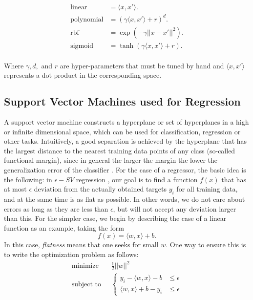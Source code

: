\begin{align}
\text{linear} &= \langle x, x' \rangle. \\
\text{polynomial} &= (\gamma \langle x, x' \rangle + r )^d .\\
\text{rbf} &= \exp(-\gamma  ||x - x'||^2 ) .\\
\text{sigmoid} &= \tanh(\gamma \langle x, x' \rangle + r ) .\\
\end{align}

Where $\gamma, d,$ and $r$ are hyper-parameters that must be tuned by hand and $\langle x, x' \rangle$ represents a dot product in the corresponding space. 
\subsection{Support Vector Machines used for Regression}
A support vector machine constructs a hyperplane or set of hyperplanes in a high or infinite dimensional space, which can be used for classification, regression or other tasks. Intuitively, a good separation is achieved by the hyperplane that has the largest distance to the nearest training data points of any class (so-called functional margin), since in general the larger the margin the lower the generalization error of the classifier \cite{SMOLA2004}. For the case of a regressor, the basic idea is the following: in $\epsilon-SV$ regression \cite{Vapnik2000}, our goal is to find a function $f(x)$ that has at most $\epsilon$ deviation from the actually obtained targets $y_i$ for all training data, and at the same time is as flat as possible. In other words, we do not care about errors as long as they are less than $\epsilon$, but will not accept any deviation larger than this. For the simpler case, we begin by describing the case of a linear function as an example, taking the form
\begin{equation}
f(x) = \langle w, x \rangle + b.
\end{equation}
In this case, \textit{flatness} means that one seeks for small $w$. One way to ensure this is to write the optimization problem as follows:
\begin{align}
\text{minimize} \,\,\, \, &\frac{1}{2}||w||^2 \\
\text{subject to} \,\,\,\, &
\begin{cases}
y_i - \langle w, x \rangle  - b & \leq \epsilon \\
\langle w, x \rangle  + b - y_i &\leq \epsilon
\end{cases}
\end{align}
